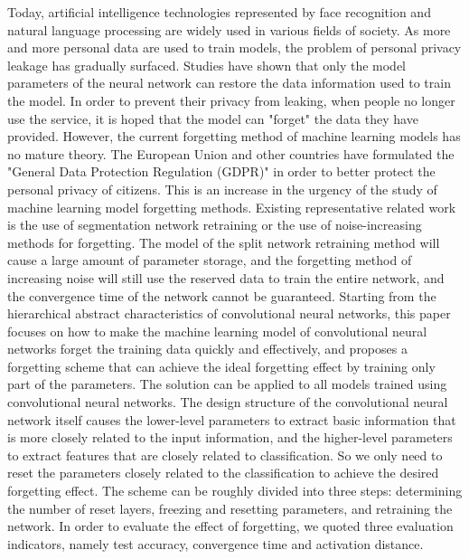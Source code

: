 \begin{abstract*}
  Today, artificial intelligence technologies represented by face recognition and natural language processing are widely used in various fields of society. 
  As more and more personal data are used to train models, the problem of personal privacy leakage has gradually surfaced.
  Studies have shown that only the model parameters of the neural network can restore the data information used to train the model.
  In order to prevent their privacy from leaking, when people no longer use the service, it is hoped that the model can "forget" the data they have provided. 
  However, the current forgetting method of machine learning models has no mature theory.
  The European Union and other countries have formulated the "General Data Protection Regulation (GDPR)" in order to better protect the personal privacy of citizens. 
  This is an increase in the urgency of the study of machine learning model forgetting methods.
  Existing representative related work is the use of segmentation network retraining or the use of noise-increasing methods for forgetting. 
  The model of the split network retraining method will cause a large amount of parameter storage, and the forgetting method of increasing noise will still use the reserved data to train the entire network, 
  and the convergence time of the network cannot be guaranteed.
  Starting from the hierarchical abstract characteristics of convolutional neural networks, 
  this paper focuses on how to make the machine learning model of convolutional neural networks forget the training data quickly and effectively, 
  and proposes a forgetting scheme that can achieve the ideal forgetting effect by training only part of the parameters. 
  The solution can be applied to all models trained using convolutional neural networks.
  The design structure of the convolutional neural network itself causes the lower-level parameters to extract basic information that is more closely related to the input information, 
  and the higher-level parameters to extract features that are closely related to classification.
  So we only need to reset the parameters closely related to the classification to achieve the desired forgetting effect.
  The scheme can be roughly divided into three steps: determining the number of reset layers, freezing and resetting parameters, and retraining the network. 
  In order to evaluate the effect of forgetting, we quoted three evaluation indicators, namely test accuracy, convergence time and activation distance.
  

\end{abstract*}
